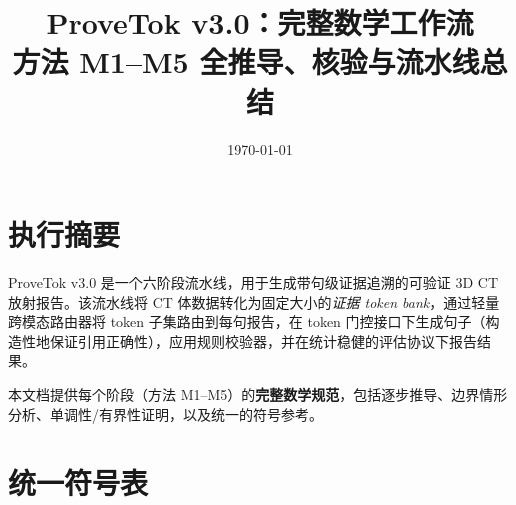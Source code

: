\documentclass[11pt,a4paper]{article}
\title{\textbf{ProveTok v3.0：完整数学工作流}\\[6pt]
\large 方法 M1--M5 全推导、核验与流水线总结}
\date{\today}
\theoremstyle{definition}
\begin{document}
\maketitle
\tableofcontents
\newpage

\section{执行摘要}

ProveTok v3.0 是一个六阶段流水线，用于生成带句级证据追溯的可验证 3D CT 放射报告。该流水线将 CT 体数据转化为固定大小的\emph{证据 token bank}，通过轻量跨模态路由器将 token 子集路由到每句报告，在 token 门控接口下生成句子（构造性地保证引用正确性），应用规则校验器，并在统计稳健的评估协议下报告结果。

本文档提供每个阶段（方法 M1--M5）的\textbf{完整数学规范}，包括逐步推导、边界情形分析、单调性/有界性证明，以及统一的符号参考。

\section{统一符号表}
\end{document}
